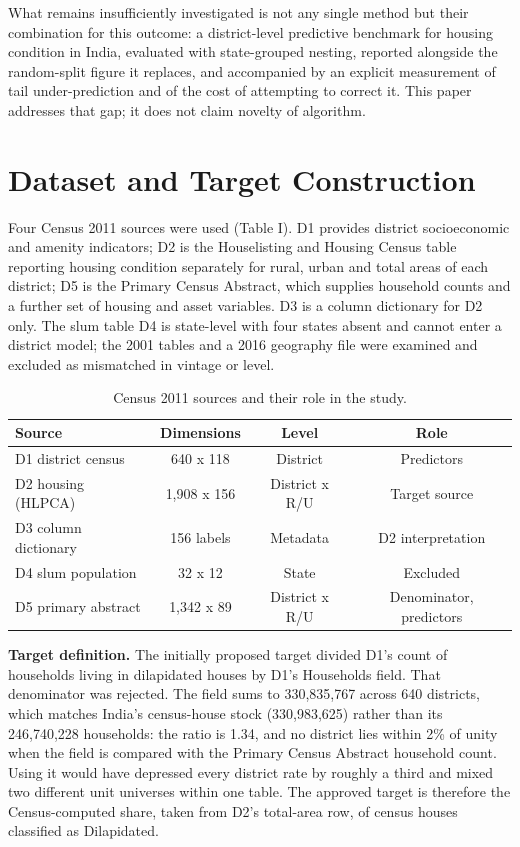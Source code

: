 \documentclass[conference]{IEEEtran}
\begin{document}
What remains insufficiently investigated is not any single method but their combination for this outcome: a district-level predictive benchmark for housing condition in India, evaluated with state-grouped nesting, reported alongside the random-split figure it replaces, and accompanied by an explicit measurement of tail under-prediction and of the cost of attempting to correct it. This paper addresses that gap; it does not claim novelty of algorithm.

\section{Dataset and Target Construction}

Four Census 2011 sources were used (Table I). D1 provides district socioeconomic and amenity indicators; D2 is the Houselisting and Housing Census table reporting housing condition separately for rural, urban and total areas of each district; D5 is the Primary Census Abstract, which supplies household counts and a further set of housing and asset variables. D3 is a column dictionary for D2 only. The slum table D4 is state-level with four states absent and cannot enter a district model; the 2001 tables and a 2016 geography file were examined and excluded as mismatched in vintage or level.

\begin{table}[t]
\centering
\caption{Census 2011 sources and their role in the study.}
\label{tab:4324}
\small
\setlength{\tabcolsep}{4pt}
\begin{tabular}{lccc}
\toprule
\textbf{Source} & \textbf{Dimensions} & \textbf{Level} & \textbf{Role} \\
\midrule
D1 district census & 640 x 118 & District & Predictors \\
D2 housing (HLPCA) & 1,908 x 156 & District x R/U & Target source \\
D3 column dictionary & 156 labels & Metadata & D2 interpretation \\
D4 slum population & 32 x 12 & State & Excluded \\
D5 primary abstract & 1,342 x 89 & District x R/U & Denominator, predictors \\
\bottomrule
\end{tabular}
\end{table}

\textbf{Target definition.} The initially proposed target divided D1's count of households living in dilapidated houses by D1's Households field. That denominator was rejected. The field sums to 330,835,767 across 640 districts, which matches India's census-house stock (330,983,625) rather than its 246,740,228 households: the ratio is 1.34, and no district lies within 2\% of unity when the field is compared with the Primary Census Abstract household count. Using it would have depressed every district rate by roughly a third and mixed two different unit universes within one table. The approved target is therefore the Census-computed share, taken from D2's total-area row, of census houses classified as Dilapidated.
\end{document}
